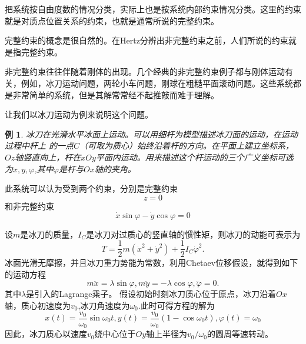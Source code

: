 \documentclass{ctexart}
\begin{document}
把系统按自由度数的情况分类，实际上也是按系统内部约束情况分类。这里的约束就是对质点位置关系的约束，也就是通常所说的完整约束。

完整约束的概念是很自然的。在Hertz分辨出非完整约束之前，人们所说的约束就是指完整约束。

非完整约束往往伴随着刚体的出现。几个经典的非完整约束例子都与刚体运动有关，例如，冰刀运动问题，两轮小车问题，刚球在粗糙平面滚动问题。这些系统都是非常简单的系统，但是其解常常经不起推敲而难于理解。

让我们以冰刀运动为例来说明这个问题。

\newtheorem{example}{例}[section]

\begin{example}
  冰刀在光滑水平冰面上运动。可以用细杆为模型描述冰刀面的运动，在运动过程中杆上 的一点$C$（可取为质心）始终沿着杆的方向。在平面上建立坐标系，$Oz$轴竖直向上，杆在$xOy$平面内运动。用来描述这个杆运动的三个广义坐标可选为$x,y,\varphi$,其中$\varphi$是杆与$Ox$轴的夹角。
\end{example}

此系统可以认为受到两个约束，分别是完整约束
\begin{equation}
  \label{eq:ice1}
  z = 0
\end{equation}
和非完整约束
\begin{equation}
  \label{eq:ice2}
  \dot{x} \sin\varphi - \dot{y} \cos\varphi = 0
\end{equation}

设$m$是冰刀的质量，$I_C$是冰刀对过质心的竖直轴的惯性矩，则冰刀的动能可表示为
\begin{equation}
  \label{eq:ice3}
  T = \frac{1}{2}m\left(\dot{x}^2+\dot{y}^2\right)+\frac{1}{2}I_C\dot{\varphi}^2.
\end{equation}
冰面光滑无摩擦，并且冰刀重力势能为常数，利用Chetaev位移假设，就得到如下的运动方程
\begin{equation}
  \label{eq:iceeom}
  m \ddot{x} = \lambda \sin\varphi, m \ddot{y} = -\lambda \cos\varphi, \ddot{\varphi} = 0.
\end{equation}
其中$\lambda$是引入的Lagrange乘子。
假设初始时刻冰刀质心位于原点，冰刀沿着$Ox$轴，质心初速度为$v_0$,冰刀角速度为$\omega_0$.此时可得方程的解为
\begin{equation}
  \label{eq:icesol}
  x(t) = \frac{v_0}{\omega_0}\sin\omega_0t, y(t) = \frac{v_0}{\omega_0}(1 - \cos\omega_0t), \varphi(t) = \omega_0
\end{equation}
因此，冰刀质心以速度$v_0$绕中心位于$Oy$轴上半径为$v_0/\omega_0$的圆周等速转动。
\end{document}
